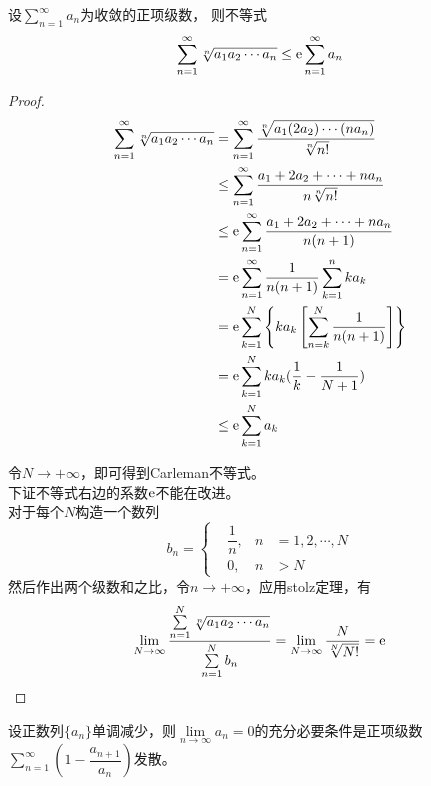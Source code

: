 \begin{proposition}[Carleman不等式]

    设$\sum\limits_{n=1}^{\infty}{a_n}$为收敛的正项级数，
    则不等式
    $$\sum\limits_{n=1}^{\infty}{\sqrt[n]{a_1a_2\cdots a_n}}\leq \mathrm{e}\sum\limits_{n=1}^{\infty}{a_n}$$

\end{proposition}

\begin{proof}

    \begin{align*}
        \sum\limits_{n=1}^{\infty}{\sqrt[n]{a_1a_2\cdots a_n}} &= \sum\limits_{n=1}^{\infty}{\dfrac{\sqrt[n]{a_1(2a_2)\cdots (na_n)}}{\sqrt[n]{n!}}}\\
        &\leq\sum\limits_{n=1}^{\infty}{\dfrac{a_1+2a_2+\cdots +na_n}{n\sqrt[n]{n!}}}\\
        &\leq\mathrm{e}\sum\limits_{n=1}^{\infty}{\dfrac{a_1+2a_2+\cdots +na_n}{n(n+1)}}\\
        &=\mathrm{e}\sum\limits_{n=1}^{\infty}{\dfrac{1}{n(n+1)}\sum\limits_{k=1}^{n}{ka_k}}\\
        &=\mathrm{e}\sum\limits_{k=1}^{N}{\left\{ka_k\left[\sum\limits_{n=k}^{N}{\dfrac{1}{n(n+1)}}\right]\right\}}\\
        &=\mathrm{e}\sum\limits_{k=1}^{N}{ka_k(\dfrac{1}{k}-\dfrac{1}{N + 1})} \\
        &\leq\mathrm{e}\sum\limits_{k=1}^{N}{a_k}
    \end{align*}

    令$N\to+\infty$，即可得到\textup{Carleman}不等式。\\
    下证不等式右边的系数$\mathrm{e}$不能在改进。\\
    对于每个$N$构造一个数列
    $$b_n=\left\{
        \begin{aligned}
            &\dfrac{1}{n}, & n & = 1,2,\cdots,N \\
            &0, & n & > N
        \end{aligned}
    \right.
    $$
    然后作出两个级数和之比，令$n\to+\infty$，应用\textup{stolz}定理，有
    $$\lim\limits_{N\to\infty}{\dfrac{\sum\limits_{n=1}^{N}{\sqrt[n]{a_1a_2\cdots a_n}}}{\sum\limits_{n=1}^{N}{b_n}}}=\lim\limits_{N\to\infty}{\dfrac{N}{\sqrt[N]{N!}}}=\mathrm{e}$$

\end{proof}

\begin{theorem}[Sapagof判别法]

设正数列$\{a_n\}$单调减少，则$\lim\limits_{n\to\infty}{a_n}=0$的充分必要条件是正项级数$\sum\limits_{n=1}^{\infty}{(1-\dfrac{a_{n+1}}{a_n})}$发散。
    
\end{theorem}

